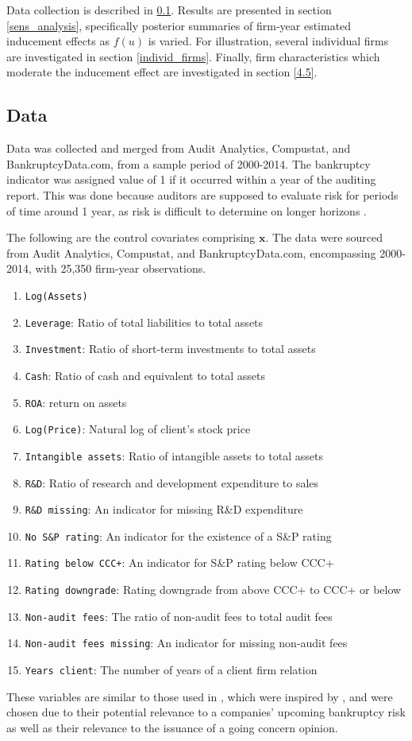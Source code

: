 \documentclass[aoas,preprint, 11pt, dvipsnames, table, x11name]{imsart}
\renewcommand{\bm}[1]{\mathbf{#1}}
\theoremstyle{remark}
\begin{document}
Data collection is described in \ref{data_section}.  Results are presented in section \ref{sens_analysis}, specifically posterior summaries of firm-year estimated inducement effects as $f(u)$ is varied.  For illustration, several individual firms are investigated in section \ref{individ_firms}.  Finally, firm characteristics which moderate the inducement effect are investigated in section \ref{4.5}.

\subsection{Data}\label{data_section} Data was collected and merged from Audit Analytics, Compustat, and BankruptcyData.com, from a sample period of 2000-2014. The bankruptcy indicator was assigned value of 1 if it occurred within a year of the auditing report.  This was done because auditors are supposed to evaluate risk for periods of time around 1 year, as risk is difficult to determine on longer horizons \citep{paper}. 

The following are the control covariates comprising $\bm{x}$. The data were sourced from  Audit Analytics, Compustat, and BankruptcyData.com, encompassing 2000-2014, with 25,350 firm-year observations.

\small 
\begin{enumerate}\label{covariates}
\itemsep0em 
\item {\tt Log(Assets)}
\item {\tt Leverage}: Ratio of total liabilities to total assets
\item {\tt Investment}: Ratio of short-term investments to total assets
\item {\tt Cash}: Ratio of cash and equivalent to total assets
\item {\tt ROA}: return on assets
\item {\tt Log(Price)}:  Natural log of client's stock price
\item {\tt Intangible assets}: Ratio of intangible assets to total assets
\item {\tt R\&D}: Ratio of research and development expenditure to sales
\item {\tt R\&D missing}: An indicator for missing R\&D expenditure
\item {\tt No S\&P rating}: An indicator for the existence of a S\&P rating
\item {\tt Rating below CCC+}: An indicator for S\&P rating below CCC+
\item {\tt Rating downgrade}: Rating downgrade from above CCC+ to CCC+ or below
\item {\tt Non-audit fees}: The ratio of non-audit fees to total audit fees
\item {\tt  Non-audit fees missing}: An indicator for missing non-audit fees
\item {\tt Years client}: The number of years of a client firm relation
\end{enumerate}
\normalsize
These variables are similar to those used in \cite{paper}, which were inspired by \cite{defond-2002}, and were chosen due to their potential relevance to a companies' upcoming bankruptcy risk as well as their relevance to the issuance of a going concern opinion. 
 
\end{document}
